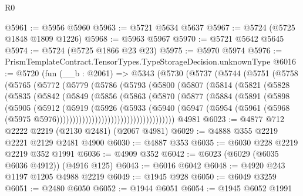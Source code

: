 \begin{lexlean}{R0}
\begin{coremodule}
@5961 := @5956 @5960
@5963 := @5721 @5634 @5637
@5967 := @5724 (@5725 @1848 @1809 @1226)
@5968 := @5963 @5967
@5970 := @5721 @5642 @5645
@5974 := @5724 (@5725 @1866 @23 @23)
@5975 := @5970 @5974
@5976 := PrismTemplateContract.TensorTypes.TypeStorageDecision.unknownType
@6016 := @5720
    (fun (__b : @2061) =>
    @5343
      (@5730
        (@5737
          (@5744
            (@5751
              (@5758
                (@5765
                  (@5772
                    (@5779
                      (@5786
                        (@5793
                          (@5800
                            (@5807
                              (@5814
                                (@5821
                                  (@5828
                                    (@5835
                                      (@5842
                                        (@5849
                                          (@5856
                                            (@5863
                                              (@5870
                                                (@5877
                                                  (@5884
                                                    (@5891
                                                      (@5898
                                                        (@5905
                                                          (@5912
                                                            (@5919
                                                              (@5926
                                                                (@5933
                                                                  (@5940
                                                                    (@5947
                                                                      (@5954
                                                                        (@5961
                                                                          (@5968
                                                                            (@5975
                                                                              @5976)))))))))))))))))))))))))))))))))))))
    @4981
@6023 := @4877 @712 @2222 @2219 (@2130 @2481) (@2067 @4981)
@6029 := @4888 @355 @2219 @2221 @2129 @2481 @4900
@6030 := @4887 @353
@6035 := @6030 @228 @2219 @2219 @352 @1991
@6036 := @4909 @352
@6042 := @6023 (@6029 (@6035 @6036 @4912)) (@4916 @125)
@6043 := @6016 @6042
@6048 := @4920 @243 @1197 @1205 @4988 @2219
@6049 := @1945 @928
@6050 := @6049 @3259
@6051 := @2480 @6050
@6052 := @1944 @6051
@6054 := @1945 @6052 @1991

\end{coremodule}
\end{lexlean}
